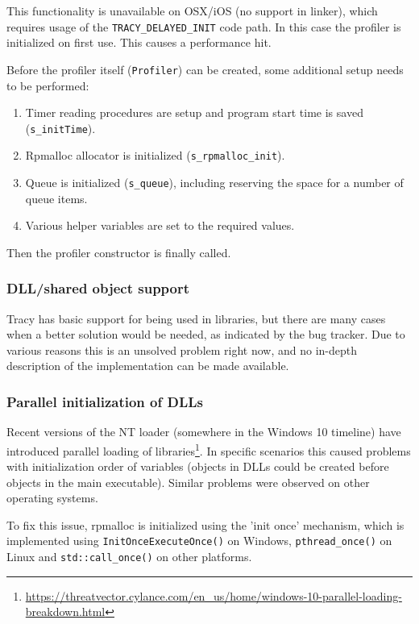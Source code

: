 \documentclass[hidelinks,titlepage,a4paper]{article}
\begin{document}
This functionality is unavailable on OSX/iOS (no support in linker), which requires usage of the \texttt{TRACY\_DELAYED\_INIT} code path. In this case the profiler is initialized on first use. This causes a performance hit.

Before the profiler itself (\texttt{Profiler}) can be created, some additional setup needs to be performed:

\begin{enumerate}
\item Timer reading procedures are setup and program start time is saved (\texttt{s\_initTime}).
\item Rpmalloc allocator is initialized (\texttt{s\_rpmalloc\_init}).
\item Queue is initialized (\texttt{s\_queue}), including reserving the space for a number of queue items.
\item Various helper variables are set to the required values.
\end{enumerate}

Then the profiler constructor is finally called.

\subsubsection{DLL/shared object support}

Tracy has basic support for being used in libraries, but there are many cases when a better solution would be needed, as indicated by the bug tracker. Due to various reasons this is an unsolved problem right now, and no in-depth description of the implementation can be made available.

\subsubsection{Parallel initialization of DLLs}

Recent versions of the NT loader (somewhere in the Windows 10 timeline) have introduced parallel loading of libraries\footnote{\url{https://threatvector.cylance.com/en_us/home/windows-10-parallel-loading-breakdown.html}}. In specific scenarios this caused problems with initialization order of variables (objects in DLLs could be created before objects in the main executable). Similar problems were observed on other operating systems.

To fix this issue, rpmalloc is initialized using the 'init once' mechanism, which is implemented using \texttt{InitOnceExecuteOnce()} on Windows, \texttt{pthread\_once()} on Linux and \texttt{std::call\_once()} on other platforms.
\end{document}
